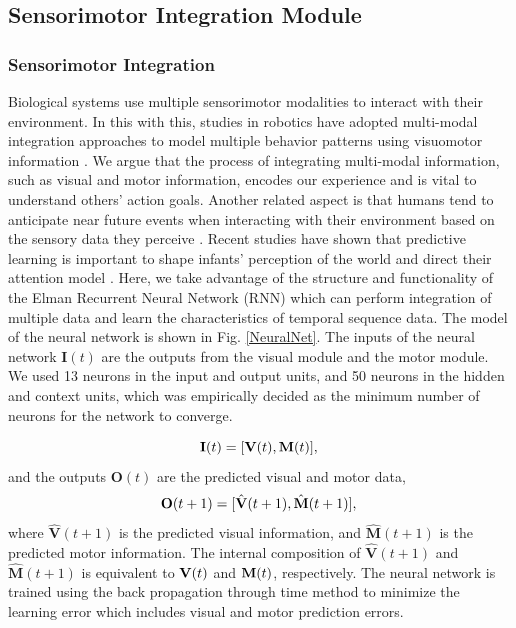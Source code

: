 \documentclass[conference]{IEEEtran}
\begin{document}
\subsection{Sensorimotor Integration Module}
\subsubsection{Sensorimotor Integration}
Biological systems use multiple sensorimotor modalities to interact with their environment. In this with this, studies in robotics have adopted multi-modal integration approaches to model multiple behavior patterns using visuomotor information \cite{noda2014multimodal}. We argue that the process of integrating multi-modal information, such as visual and motor information, encodes our experience and is vital to understand others' action goals. Another related aspect is that humans tend to anticipate near future events when interacting with their environment based on the sensory data they perceive \cite{cannon2012infants}. Recent studies have shown that predictive learning is important to shape infants' perception of the world and direct their attention model \cite{den2012prediction}. Here, we take advantage of the structure and functionality of the Elman Recurrent Neural Network (RNN) \cite{elman1990finding} which can perform integration of multiple data and learn the characteristics of temporal sequence data. The model of the neural network is shown in Fig. \ref{NeuralNet}. The inputs of the neural network \(\textbf{I}(t)\) are the outputs from the visual module and the motor module. We used 13 neurons in the input and output units, and 50 neurons in the hidden and context units, which was empirically decided as the minimum number of neurons for the network to converge.

\begin{equation}
	\textbf{I}(t)=[\textbf{V}(t), \textbf{M}(t)],\\
\end{equation}
and the outputs \(\textbf{O}(t)\) are the predicted visual and motor data,
\begin{equation}
	\textbf{O}(t+1)=[\hat{\textbf{V}}(t+1), \hat{\textbf{M}}(t+1)],\\
\end{equation}
where \(\hat{\textbf{V}}(t+1)\) is the predicted visual information, and  \(\hat{\textbf{M}}(t+1)\) is the predicted motor information. The internal composition of \(\hat{\textbf{V}}(t+1)\) and \(\hat{\textbf{M}}(t+1)\) is equivalent to \(\text{\textbf{V}}(t)\) and \(\text{\textbf{M}}(t)\), respectively. The neural network is trained using the back propagation through time method to minimize the learning error which includes visual and motor prediction errors.
\end{document}
